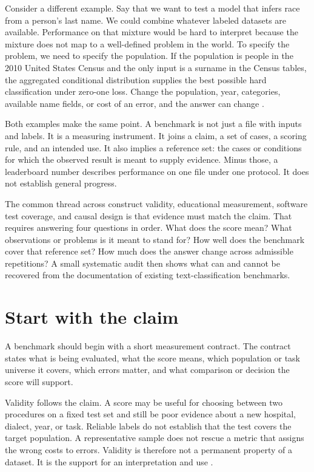 \documentclass[11pt]{article}
\begin{document}
Consider a different example. Say that we want to test a model that infers race from a person's last name. We could combine whatever labeled datasets are available. Performance on that mixture would be hard to interpret because the mixture does not map to a well-defined problem in the world. To specify the problem, we need to specify the population. If the population is people in the 2010 United States Census and the only input is a surname in the Census tables, the aggregated conditional distribution supplies the best possible hard classification under zero-one loss. Change the population, year, categories, available name fields, or cost of an error, and the answer can change \citep{uscensus2016surnames,laohaprapanon2025ethnicolr}.

Both examples make the same point. A benchmark is not just a file with inputs and labels. It is a measuring instrument. It joins a claim, a set of cases, a scoring rule, and an intended use. It also implies a reference set: the cases or conditions for which the observed result is meant to supply evidence. Minus those, a leaderboard number describes performance on one file under one protocol. It does not establish general progress.

The common thread across construct validity, educational measurement, software test coverage, and causal design is that evidence must match the claim. That requires answering four questions in order. What does the score mean? What observations or problems is it meant to stand for? How well does the benchmark cover that reference set? How much does the answer change across admissible repetitions? A small systematic audit then shows what can and cannot be recovered from the documentation of existing text-classification benchmarks.

\section*{Start with the claim}

A benchmark should begin with a short measurement contract. The contract states what is being evaluated, what the score means, which population or task universe it covers, which errors matter, and what comparison or decision the score will support.

Validity follows the claim. A score may be useful for choosing between two procedures on a fixed test set and still be poor evidence about a new hospital, dialect, year, or task. Reliable labels do not establish that the test covers the target population. A representative sample does not rescue a metric that assigns the wrong costs to errors. Validity is therefore not a permanent property of a dataset. It is the support for an interpretation and use \citep{messick1995validity,kane2013validating}.
\end{document}
